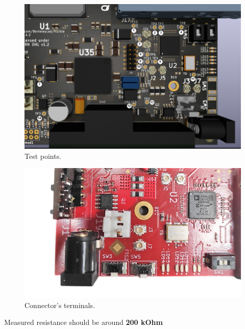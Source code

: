 \documentclass[12pt,oneside,a4]{article}
\begin{document}
\begin{figure}[H]
\begin{center}
\includegraphics[width=1\linewidth]{Marble_TP.png}
 \caption{Test points. }\label{tp}
\end{center}
\end{figure}


\begin{figure}[H]
\begin{center}
\includegraphics[width=0.9\linewidth]{J19.png}
 \caption{Connector's terminals. }\label{01}
\end{center}
\end{figure}
\begin{leftbar}
Measured resistance should be around \textbf{{\color{red}200 kOhm}}
\end{leftbar}
\end{document}
